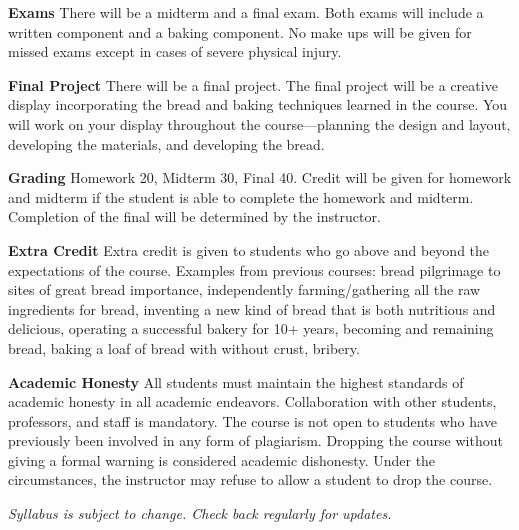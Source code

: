 \documentclass[12pt]{article}
\begin{document}
\textbf{Exams} There will be a midterm and a final exam. Both exams will include a written component and a baking component. No make ups will be given for missed exams except in cases of severe physical injury. 

\textbf{Final Project} There will be a final project. The final project will be a creative display incorporating the bread and baking techniques learned in the course. You will work on your display throughout the course---planning the design and layout, developing the materials, and developing the bread. 

\textbf{Grading} Homework 20, Midterm 30, Final 40. Credit will be given for homework and midterm if the student is able to complete the homework and midterm. Completion of the final will be determined by the instructor.

\textbf{Extra Credit} Extra credit is given to students who go above and beyond the expectations of the course. Examples from previous courses: bread pilgrimage to sites of great bread importance, independently farming/gathering all the raw ingredients for bread, inventing a new kind of bread that is both nutritious and delicious, operating a successful bakery for 10+ years, becoming and remaining bread, baking a loaf of bread with without crust, bribery.

\textbf{Academic Honesty} All students must maintain the highest standards of academic honesty in all academic endeavors. Collaboration with other students, professors, and staff is mandatory. The course is not open to students who have previously been involved in any form of plagiarism. Dropping the course without giving a formal warning is considered academic dishonesty. Under the circumstances, the instructor may refuse to allow a student to drop the course.

\textit{Syllabus is subject to change. Check back regularly for updates.} 
\end{document}

